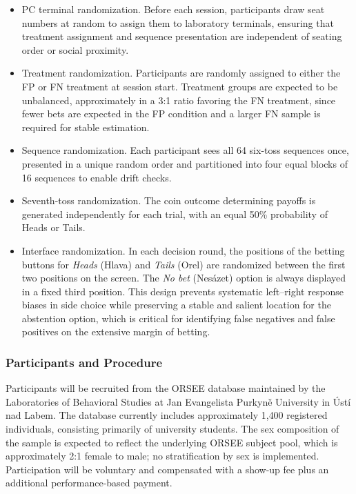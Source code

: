\documentclass[11pt,a4paper]{article}
\numberwithin{equation}{section}
\begin{document}
\begin{itemize}
	\item PC terminal randomization. Before each session, participants draw seat numbers at random to assign them to laboratory terminals, ensuring that treatment assignment and sequence presentation are independent of seating order or social proximity.
	
	\item Treatment randomization. Participants are randomly assigned to either the FP or FN treatment at session start. Treatment groups are expected to be unbalanced, approximately in a 3:1 ratio favoring the FN treatment, since fewer bets are expected in the FP condition and a larger FN sample is required for stable estimation.
	
	\item Sequence randomization. Each participant sees all 64 six-toss sequences once, presented in a unique random order and partitioned into four equal blocks of 16 sequences to enable drift checks.
	
	\item Seventh-toss randomization. The coin outcome determining payoffs is generated independently for each trial, with an equal 50\% probability of Heads or Tails.
	
	\item Interface randomization. In each decision round, the positions of the betting buttons for \emph{Heads} (Hlava) and \emph{Tails} (Orel) are randomized between the first two positions on the screen. The \emph{No bet} (Nesázet) option is always displayed in a fixed third position. This design prevents systematic left--right response biases in side choice while preserving a stable and salient location for the abstention option, which is critical for identifying false negatives and false positives on the extensive margin of betting.
	
\end{itemize}

	
\subsubsection{Participants and Procedure}
\label{Sec:DataCollection}
Participants will be recruited from the ORSEE database maintained by the Laboratories of Behavioral Studies at Jan Evangelista Purkyně University in Ústí nad Labem. The database currently includes approximately 1{,}400 registered individuals, consisting primarily of university students.
The sex composition of the sample is expected to reflect the underlying ORSEE subject pool, which is approximately 2:1 female to male; no stratification by sex is implemented. 
Participation will be voluntary and compensated with a show-up fee plus an additional performance-based payment.
\end{document}
